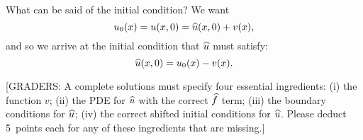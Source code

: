 {\begin{solution}
What can be said of the initial condition? We want
\[ u_0(x) = u(x,0) = \widehat{u}(x,0) + v(x),\]
and so we arrive at the initial condition that $\widehat{u}$ must satisfy:
\[ \widehat{u}(x,0) = u_0(x)-v(x).\]

[GRADERS: A complete solutions must specify four essential ingredients:
(i) the function $v$; (ii) the PDE for $\widehat{u}$ with the correct $\widehat{f}$ term;
(iii) the boundary conditions for $\widehat{u}$; (iv) the correct shifted initial
conditions for $\widehat{u}$.  Please deduct 5~points each for any of these ingredients
that are missing.]
\end{solution}}{}


